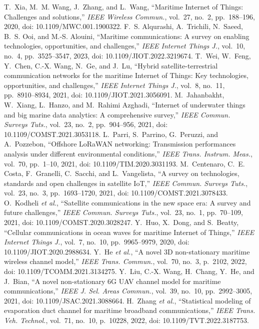  T.~Xia, M.~M. Wang, J.~Zhang, and L.~Wang, ``Maritime Internet of Things: Challenges and solutions,'' \emph{IEEE Wireless Commun.}, vol.~27, no.~2, pp.~188--196, 2020, doi: 10.1109/MWC.001.1900322.
 F.~S. Alqurashi, A.~Trichili, N.~Saeed, B.~S. Ooi, and M.-S. Alouini, ``Maritime communications: A survey on enabling technologies, opportunities, and challenges,'' \emph{IEEE Internet Things J.}, vol.~10, no.~4, pp.~3525--3547, 2023, doi: 10.1109/JIOT.2022.3219674.
 T.~Wei, W.~Feng, Y.~Chen, C.-X. Wang, N.~Ge, and J.~Lu, ``Hybrid satellite-terrestrial communication networks for the maritime Internet of Things: Key technologies, opportunities, and challenges,'' \emph{IEEE Internet Things J.}, vol.~8, no.~11, pp.~8910--8934, 2021, doi: 10.1109/JIOT.2021.3056091.
 M.~Jahanbakht, W.~Xiang, L.~Hanzo, and M.~Rahimi Azghadi, ``Internet of underwater things and big marine data analytics: A comprehensive survey,'' \emph{IEEE Commun. Surveys Tuts.}, vol.~23, no.~2, pp.~904--956, 2021, doi: 10.1109/COMST.2021.3053118.
 L.~Parri, S.~Parrino, G.~Peruzzi, and A.~Pozzebon, ``Offshore LoRaWAN networking: Transmission performances analysis under different environmental conditions,'' \emph{IEEE Trans. Instrum. Meas.}, vol.~70, pp.~1--10, 2021, doi: 10.1109/TIM.2020.3031193.
 M.~Centenaro, C.~E. Costa, F.~Granelli, C.~Sacchi, and L.~Vangelista, ``A survey on technologies, standards and open challenges in satellite IoT,'' \emph{IEEE Commun. Surveys Tuts.}, vol.~23, no.~3, pp.~1693--1720, 2021, doi: 10.1109/COMST.2021.3078433.
 O.~Kodheli \emph{et al.}, ``Satellite communications in the new space era: A survey and future challenges,'' \emph{IEEE Commun. Surveys Tuts.}, vol.~23, no.~1, pp.~70--109, 2021, doi: 10.1109/COMST.2020.3028247.
 Y.~Huo, X.~Dong, and S.~Beatty, ``Cellular communications in ocean waves for maritime Internet of Things,'' \emph{IEEE Internet Things J.}, vol.~7, no.~10, pp.~9965--9979, 2020, doi: 10.1109/JIOT.2020.2988634.
 Y.~He \emph{et al.}, ``A novel 3D non-stationary maritime wireless channel model,'' \emph{IEEE Trans. Commun.}, vol.~70, no.~3, p.~2102, 2022, doi: 10.1109/TCOMM.2021.3134275.
 Y.~Liu, C.-X. Wang, H.~Chang, Y.~He, and J.~Bian, ``A novel non-stationary 6G UAV channel model for maritime communications,'' \emph{IEEE J. Sel. Areas Commun.}, vol.~39, no.~10, pp.~2992--3005, 2021, doi: 10.1109/JSAC.2021.3088664.
 H.~Zhang \emph{et al.}, ``Statistical modeling of evaporation duct channel for maritime broadband communications,'' \emph{IEEE Trans. Veh. Technol.}, vol.~71, no.~10, p.~10228, 2022, doi: 10.1109/TVT.2022.3187753.

